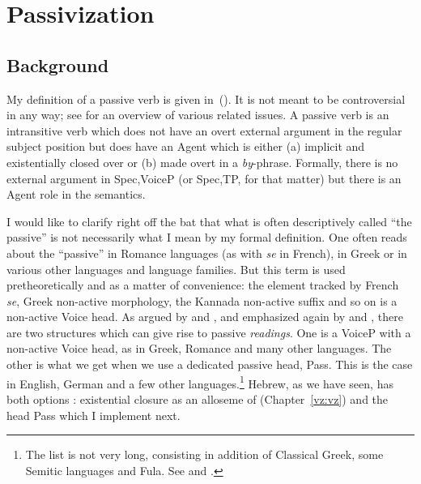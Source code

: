 \section{Passivization} \label{passn:pass}
	\subsection{Background}
My definition of a passive verb is given in~(\nextx). It is not meant to be controversial in any way; see \cite{williams15} for an overview of various related issues.
\pex
	\a A passive verb is an intransitive verb which does not have an overt external argument in the regular subject position but does have an Agent which is either (a) implicit and existentially closed over or (b) made overt in a \emph{by}-phrase.
	\a Formally, there is no external argument in Spec,VoiceP (or Spec,TP, for that matter) but there is an Agent role in the semantics.
\xe

I would like to clarify right off the bat that what is often descriptively called ``the passive'' is not necessarily what I mean by my formal definition. One often reads about the ``passive'' in Romance languages (as with \emph{se} in French), in Greek or in various other languages and language families. But this term is used pretheoretically and as a matter of convenience: the element tracked by French \emph{se}, Greek non-active morphology, the Kannada non-active suffix \citep{lidz01} and so on is a non-active Voice head. As argued by \cite{alexiadoudoron12} and \citet[123]{layering15}, and emphasized again by \cite{spathasetal15} and \cite{kastnerzu17}, there are two structures which can give rise to passive \emph{readings}. One is a VoiceP with a non-active Voice head, as in Greek, Romance and many other languages. The other is what we get when we use a dedicated passive head, Pass. This is the case in English, German and a few other languages.\footnote{The list is not very long, consisting in addition of Classical Greek, some Semitic languages and Fula. See \cite{klaiman91} and \cite{alexiadoudoron12}.} Hebrew, as we have seen, has both options \citep{alexiadoudoron12}: existential closure as an alloseme of {\vz} (Chapter~\ref{vz:vz}) and the head Pass which I implement next.

